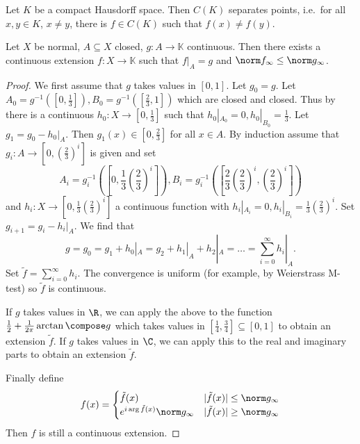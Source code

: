\documentclass[a4paper]{article}
\newcommand{\K}{{\mathbb{K}}} %
\begin{document}
\begin{corollary}
  Let \(K\) be a compact Hausdorff space. Then \(C(K)\) separates points, i.e.\ for all \(x, y \in K\), \(x \neq y\), there is \(f \in C(K)\) such that \(f(x) \neq f(y)\).
\end{corollary}

\begin{theorem}
  Let \(X\) be normal, \(A \subseteq X\) closed, \(g: A \to \K\) continuous. Then there exists a continuous extension \(f: X \to \K\) such that \(f|_A = g\) and \(\norm f_\infty \leq \norm g_\infty\).
\end{theorem}

\begin{proof}
  We first assume that \(g\) takes values in \([0, 1]\). Let \(g_0 = g\). Let \(A_0 = g^{-1}([0, \frac{1}{3}]), B_0 = g^{-1}([\frac{2}{3}, 1])\) which are closed and closed. Thus by  there is a continuous \(h_0: X \to [0, \frac{1}{3}]\) such that \(h_0|_{A_0} = 0, h_0|_{B_0} = \frac{1}{3}\). Let \(g_1 = g_0 - h_0|_A\). Then \(g_1(x) \in [0, \frac{2}{3}]\) for all \(x \in A\). By induction assume that \(g_i: A \to [0, \left(\frac{2}{3}\right)^i]\) is given and set
  \[
    A_i = g_i^{-1}(\left[0, \frac{1}{3} \left(\frac{2}{3}\right)^i \right]), B_i = g_i^{-1}(\left[ \frac{2}{3} \left(\frac{2}{3}\right)^i, \left(\frac{2}{3}\right)^i \right])
  \]
  and \(h_i: X \to [0, \frac{1}{3}\left(\frac{2}{3}\right)^i]\) a continuous function with \(h_i|_{A_i} = 0, h_i|_{B_i} = \frac{1}{3}\left(\frac{2}{3}\right)^i\). Set \(g_{i + 1} = g_i - h_i|_A\). We find that
  \[
    g
    = g_0
    = g_1 + h_0|_A
    = g_2 + h_1|_A + h_2|_A
    = \dots
    = \sum_{i = 0}^\infty h_i|_A.
  \]
  Set \(\tilde f = \sum_{i = 0}^\infty h_i\). The convergence is uniform (for example, by Weierstrass M-test) so \(\tilde f\) is continuous.

  If \(g\) takes values in \(\R\), we can apply the above to the function \(\frac{1}{2} + \frac{1}{2\pi} \arctan \compose g\) which takes values in \([\frac{1}{4}, \frac{3}{4}] \subseteq [0, 1]\) to obtain an extension \(\tilde f\). If \(g\) takes values in \(\C\), we can apply this to the real and imaginary parts to obtain an extension \(\tilde f\).

  Finally define
  \[
    f(x) =
    \begin{cases}
      \tilde f(x) & |\tilde f(x)| \leq \norm g_\infty \\
      e^{i \arg \tilde f(x)} \norm g_\infty & |\tilde f(x)| \geq \norm g_\infty
    \end{cases}
  \]
  Then \(f\) is still a continuous extension.
\end{proof}
\end{document}
